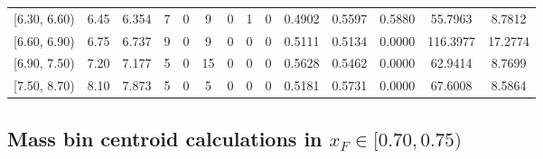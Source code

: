 \begin{table}[htbp]
{\begin{tabular}{cc|c|cccccc|ccc|cc}
        {[6.30, 6.60)} & 6.45 & 6.354 & 7 & 0 & 9 & 0 & 1 & 0 & 0.4902 & 0.5597 & 0.5880 & 55.7963 & 8.7812 \\
        {[6.60, 6.90)} & 6.75 & 6.737 & 9 & 0 & 9 & 0 & 0 & 0 & 0.5111 & 0.5134 & 0.0000 & 116.3977 & 17.2774 \\
        {[6.90, 7.50)} & 7.20 & 7.177 & 5 & 0 & 15 & 0 & 0 & 0 & 0.5628 & 0.5462 & 0.0000 & 62.9414 & 8.7699 \\
        {[7.50, 8.70)} & 8.10 & 7.873 & 5 & 0 & 5 & 0 & 0 & 0 & 0.5181 & 0.5731 & 0.0000 & 67.6008 & 8.5864 \\
        \hline\hline
    \end{tabular}
    }
\end{table}

\clearpage
\subsection{\texorpdfstring{Mass bin centroid calculations in $x_F \in [0.70, 0.75)$}{Mass bin centroid calculations in x\_F in [0.70, 0.75)]}}

